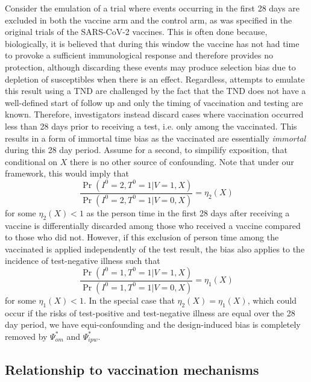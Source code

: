 \begin{appendix}
Consider the emulation of a trial where events occurring in the first 28 days are excluded in both the vaccine arm and the control arm, as was specified in the original trials of the SARS-CoV-2 vaccines. This is often done because, biologically, it is believed that during this window the vaccine has not had time to provoke a sufficient immunological response and therefore provides no protection, although discarding these events may produce selection bias due to depletion of susceptibles when there is an effect. Regardless, attempts to emulate this result using a TND are challenged by the fact that the TND does not have a well-defined start of follow up and only the timing of vaccination and testing are known. Therefore, investigators instead discard cases where vaccination occurred less than 28 days prior to receiving a test, i.e. only among the vaccinated. This results in a form of immortal time bias as the vaccinated are essentially \textit{immortal} during this 28 day period. Assume for a second, to simpilify exposition, that conditional on $X$ there is no other source of confounding. Note that under our framework, this would imply that 
\begin{equation*}
     \frac{\Pr(I^0 = 2, T^0 = 1 | V = 1, X)}{\Pr(I^0 = 2, T^0 = 1| V = 0, X)} = \eta_2(X)
\end{equation*}
for some $\eta_2(X) < 1$ as the person time in the first 28 days after receiving a vaccine is differentially discarded among those who received a vaccine compared to those who did not. However, if this exclusion of person time among the vaccinated is applied independently of the test result,  the bias also applies to the incidence of test-negative illness such that
\begin{equation*}
     \frac{\Pr(I^0 = 1, T^0 = 1 | V = 1, X)}{\Pr(I^0 = 1, T^0 = 1| V = 0, X)} = \eta_1(X)
\end{equation*}
for some $\eta_1(X) < 1$. In the special case that $\eta_2(X) = \eta_1(X)$, which could occur if the risks of test-positive and test-negative illness are equal over the 28 day period, we have equi-confounding and the design-induced bias is completely removed by $\Psi^*_{om}$ and $\Psi^*_{ipw}$.


\subsection{Relationship to vaccination mechanisms} \label{sec:vaccine_modelling}

\newpage

\end{appendix}
